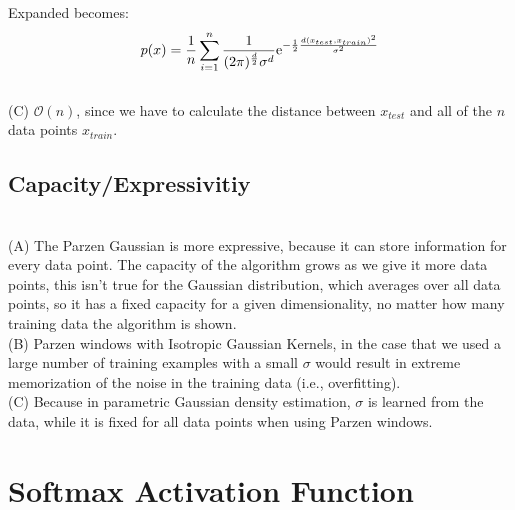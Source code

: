 \documentclass{amsart}
\theoremstyle{definition}
\theoremstyle{remark}
\numberwithin{equation}{section}
\begin{document}
Expanded becomes: \\

\begin{equation}
    p(x) = \frac{1}{n}\sum_{i=1}^{n} \frac{1}{(2\pi)^{\frac{d}{2}} \sigma^d} {\rm e}^{-\frac{1}{2}\frac{d(x_{test}, x_{train})^2}{\sigma^2} }
\end{equation}\\

(C) $\mathcal{O}(n)$, since we have to calculate the distance between $x_{test}$ and all of the $n$ data points $x_{train}$. \\

\subsection{Capacity/Expressivitiy} \\

(A) The Parzen Gaussian is more expressive, because it can store information for every data point. The capacity of the algorithm grows as we give it more data points, this isn't true for the Gaussian distribution, which averages over all data points, so it has a fixed capacity for a given dimensionality, no matter how many training data the algorithm is shown. \\

(B) Parzen windows with Isotropic Gaussian Kernels, in the case that we used a large number of training examples with a small $\sigma$ would result in extreme memorization of the noise in the training data (i.e., overfitting). \\

(C) Because in parametric Gaussian density estimation, $\sigma$ is learned from the data, while it is fixed for all data points when using Parzen windows. \\ 

\section{Softmax Activation Function}
\end{document}
